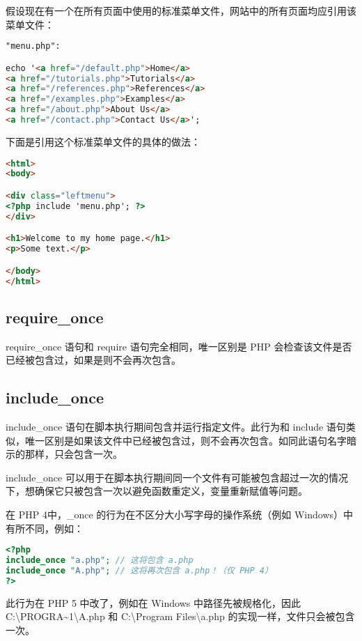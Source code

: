 假设现在有一个在所有页面中使用的标准菜单文件，网站中的所有页面均应引用该菜单文件：

\begin{lstlisting}[language=HTML]
"menu.php":

echo '<a href="/default.php">Home</a>
<a href="/tutorials.php">Tutorials</a>
<a href="/references.php">References</a>
<a href="/examples.php">Examples</a>
<a href="/about.php">About Us</a>
<a href="/contact.php">Contact Us</a>';
\end{lstlisting}

下面是引用这个标准菜单文件的具体的做法：

\begin{lstlisting}[language=HTML]
<html>
<body>

<div class="leftmenu">
<?php include 'menu.php'; ?>
</div>

<h1>Welcome to my home page.</h1>
<p>Some text.</p>

</body>
</html>
\end{lstlisting}


\subsection{require\_once}

require\_once 语句和 require 语句完全相同，唯一区别是 PHP 会检查该文件是否已经被包含过，如果是则不会再次包含。

\subsection{include\_once}

include\_once 语句在脚本执行期间包含并运行指定文件。此行为和 include 语句类似，唯一区别是如果该文件中已经被包含过，则不会再次包含。如同此语句名字暗示的那样，只会包含一次。

include\_once 可以用于在脚本执行期间同一个文件有可能被包含超过一次的情况下，想确保它只被包含一次以避免函数重定义，变量重新赋值等问题。

在 PHP 4中，\_once 的行为在不区分大小写字母的操作系统（例如 Windows）中有所不同，例如：


\begin{lstlisting}[language=PHP]
<?php
include_once "a.php"; // 这将包含 a.php
include_once "A.php"; // 这将再次包含 a.php！（仅 PHP 4）
?>
\end{lstlisting}

此行为在 PHP 5 中改了，例如在 Windows 中路径先被规格化，因此 C:\textbackslash PROGRA\~{}1\textbackslash A.php 和 C:\textbackslash Program Files\textbackslash a.php 的实现一样，文件只会被包含一次。


